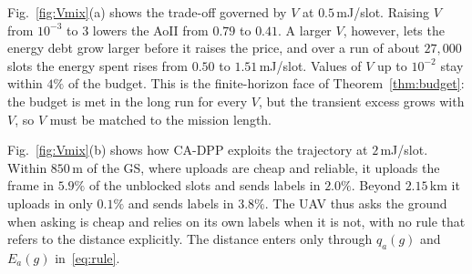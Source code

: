 Fig.~\ref{fig:Vmix}(a) shows the trade-off governed by $V$ at $0.5$\,mJ/slot. Raising $V$ from $10^{-3}$ to $3$ lowers the AoII from $0.79$ to $0.41$. A larger $V$, however, lets the energy debt grow larger before it raises the price, and over a run of about $27{,}000$ slots the energy spent rises from $0.50$ to $1.51$\,mJ/slot. Values of $V$ up to $10^{-2}$ stay within $4\%$ of the budget. This is the finite-horizon face of Theorem~\ref{thm:budget}: the budget is met in the long run for every $V$, but the transient excess grows with $V$, so $V$ must be matched to the mission length.

Fig.~\ref{fig:Vmix}(b) shows how CA-DPP exploits the trajectory at $2$\,mJ/slot. Within $850$\,m of the GS, where uploads are cheap and reliable, it uploads the frame in $5.9\%$ of the unblocked slots and sends labels in $2.0\%$. Beyond $2.15$\,km it uploads in only $0.1\%$ and sends labels in $3.8\%$. The UAV thus asks the ground when asking is cheap and relies on its own labels when it is not, with no rule that refers to the distance explicitly. The distance enters only through $q_a(g)$ and $E_a(g)$ in~\eqref{eq:rule}.
